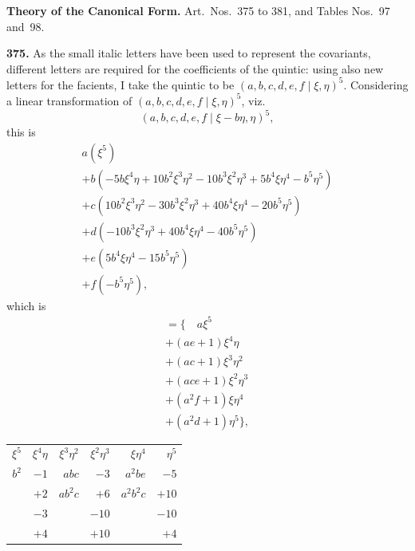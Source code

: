 \documentclass[12pt,a4paper]{article}
\begin{document}
\newpage
\noindent\textbf{Theory of the Canonical Form.} Art.\ Nos.\ 375 to 381, and Tables Nos.~97 and~98.

\medskip

\noindent\textbf{375.} As the small italic letters have been used to represent the covariants, different letters are required for the coefficients of the quintic: using also new letters for the facients, I take the quintic to be $(a, b, c, d, e, f \mid \xi, \eta)^5$. Considering a linear transformation of $(a, b, c, d, e, f \mid \xi, \eta)^5$, viz.
\[
(a, b, c, d, e, f \mid \xi - b\eta, \eta)^5,
\]
this is
\begin{multline*}
a(\xi^5) \\
+ b(-5b\xi^4\eta + 10b^2\xi^3\eta^2 - 10b^3\xi^2\eta^3 + 5b^4\xi\eta^4 - b^5\eta^5) \\
+ c(10b^2\xi^3\eta^2 - 30b^3\xi^2\eta^3 + 40b^4\xi\eta^4 - 20b^5\eta^5) \\
+ d(-10b^3\xi^2\eta^3 + 40b^4\xi\eta^4 - 40b^5\eta^5) \\
+ e(5b^4\xi\eta^4 - 15b^5\eta^5) \\
+ f(-b^5\eta^5),
\end{multline*}
which is
\begin{multline*}
= \{\quad a\xi^5 \\
+ (ae + 1)\xi^4\eta \\
+ (ac + 1)\xi^3\eta^2 \\
+ (ace + 1)\xi^2\eta^3 \\
+ (a^2 f + 1)\xi\eta^4 \\
+ (a^2 d + 1)\eta^5\},
\end{multline*}
\begin{center}
\begin{tabular}{r@{\quad}r@{\quad}r@{\quad}r@{\quad}r@{\quad}r}
$\xi^5$ & $\xi^4\eta$ & $\xi^3\eta^2$ & $\xi^2\eta^3$ & $\xi\eta^4$ & $\eta^5$ \\[2pt]
$b^2$ & $-1$ & $abc$ & $-3$ & $a^2 be$ & $-5$ \\
& $+2$ & $ab^2 c$ & $+6$ & $a^2 b^2 c$ & $+10$ \\
& $-3$ & & $-10$ & & $-10$ \\
& $+4$ & & $+10$ & & $+4$
\end{tabular}
\end{center}
\end{document}

